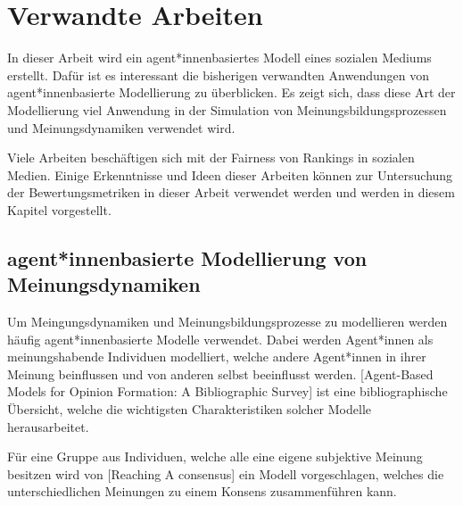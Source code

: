 \chapter{Verwandte Arbeiten}


In dieser Arbeit wird ein agent*innenbasiertes Modell eines sozialen Mediums erstellt. Dafür ist es interessant die bisherigen verwandten Anwendungen von agent*innenbasierte Modellierung zu überblicken. Es zeigt sich, dass diese Art der Modellierung viel Anwendung in der Simulation von Meinungsbildungsprozessen und Meinungsdynamiken verwendet wird.

Viele Arbeiten beschäftigen sich mit der Fairness von Rankings in sozialen Medien. Einige Erkenntnisse und Ideen dieser Arbeiten können zur Untersuchung der Bewertungsmetriken in dieser Arbeit verwendet werden und werden in diesem Kapitel vorgestellt.

\section{agent*innenbasierte Modellierung von Meinungsdynamiken}

Um Meingungsdynamiken und Meinungsbildungsprozesse zu modellieren werden häufig agent*innenbasierte Modelle verwendet. Dabei werden Agent*innen als meinungshabende Individuen modelliert, welche andere Agent*innen in ihrer Meinung beinflussen und von anderen selbst beeinflusst werden. [Agent-Based Models for Opinion Formation: A Bibliographic Survey] ist eine bibliographische Übersicht, welche die wichtigsten Charakteristiken solcher Modelle herausarbeitet.


Für eine Gruppe aus Individuen, welche alle eine eigene subjektive Meinung besitzen wird von [Reaching A consensus] ein Modell vorgeschlagen, welches die unterschiedlichen Meinungen zu einem Konsens zusammenführen kann.

